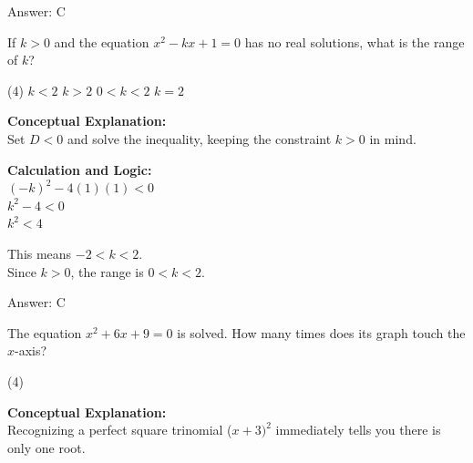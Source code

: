 \documentclass[11pt,paper=a4,answers]{exam}
\begin{document}
\begin{questions}
\begin{solution}
\vspace{25pt}

Answer: \colorbox{yellow!100}{C}
\end{solution}

\vspace{40pt}

\question
If $k > 0$ and the equation $x^2 - kx + 1 = 0$ has no real solutions, what is the range of $k$?
\begin{tasks}(4)
    \task $k < 2$
    \task $k > 2$
    \task $0 < k < 2$
    \task $k = 2$
\end{tasks}

\begin{solution}
\textbf{Conceptual Explanation:} \\
Set $D < 0$ and solve the inequality, keeping the constraint $k > 0$ in mind.

\vspace{20pt}

\textbf{Calculation and Logic:} \\
$(-k)^2 - 4(1)(1) < 0$ \\
$k^2 - 4 < 0$ \\
$k^2 < 4$

\vspace{10pt}

This means $-2 < k < 2$. \\
Since $k > 0$, the range is $0 < k < 2$.

\vspace{25pt}

Answer: \colorbox{yellow!100}{C}
\end{solution}

\vspace{40pt}

\question
The equation $x^2 + 6x + 9 = 0$ is solved. How many times does its graph touch the $x$-axis?
\begin{tasks}(4)
\end{tasks}

\begin{solution}
\textbf{Conceptual Explanation:} \\
Recognizing a perfect square trinomial ($x+3)^2$ immediately tells you there is only one root.

\vspace{20pt}


\end{solution}
\end{questions}
\end{document}
